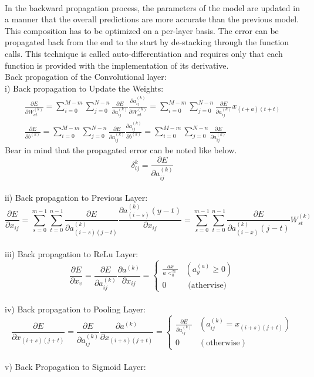 \documentclass[12pt]{revtex4}
\begin{document}
\\In the backward propagation process, the parameters of the model are updated in a manner that the overall predictions are more accurate than the previous model. This composition has to be optimized on a per-layer basis. The error can be propagated back from the end to the start by de-stacking through the function calls. This technique is called auto-differentiation and requires only that each function is provided with the implementation of its derivative.
\\Back propagation of the Convolutional layer:
\\i) Back propagation to Update the Weights:
\begin{equation}\begin{array}{c}
\frac{\partial E}{\partial W_{a t}^{(k)}}=\sum_{i=0}^{M-m} \sum_{j=0}^{N-n} \frac{\partial E}{\partial a_{i j}^{(k)}} \frac{\partial a_{i j}^{(k)}}{\partial W_{n t}^{(k)}}=\sum_{i=0}^{M-m} \sum_{j=0}^{N-n} \frac{\partial E}{\partial a_{i j}^{(k)}} x_{(i+a)(t+t)} \\
\frac{\partial E}{\partial b^{(k)}}=\sum_{i=0}^{M-m} \sum_{j=0}^{N-n} \frac{\partial E}{\partial a_{i j}^{(k)}} \frac{\partial a_{i j}^{(k)}}{\partial b^{(k)}}=\sum_{i=0}^{M-m} \sum_{j=0}^{N-n} \frac{\partial E}{\partial a_{i j}^{(k)}}
\end{array}\end{equation}
Bear in mind that the propagated error can be noted like below.
\[
\delta_{i j}^{k}=\frac{\partial E}{\partial a_{i j}^{(k)}}
\]
\\ii) Back propagation to Previous Layer:
\begin{equation}\frac{\partial E}{\partial x_{i j}}=\sum_{s=0}^{m-1} \sum_{t=0}^{n-1} \frac{\partial E}{\partial a_{(i-s)(j-t)}^{(k)}} \frac{\partial a_{(i-s)}^{(k)}(y-t)}{\partial x_{i j}}=\sum_{s=0}^{m-1} \sum_{t=0}^{n-1} \frac{\partial E}{\partial a_{(i-x)}^{(k)}(j-t)} W_{s t}^{(k)}\end{equation}
\\iii) Back propagation to ReLu Layer:
\begin{equation}\frac{\partial E}{\partial x_{v}}=\frac{\partial E}{\partial a_{i j}^{(k)}} \frac{\partial a^{(k)}}{\partial x_{i j}}=\left\{\begin{array}{ll}
\frac{a x}{a<_{0}^{\infty}} & \left(a_{y}^{(a)} \geq 0\right) \\
0 & \text { (athervise) }
\end{array}\right.\end{equation}
\\iv) Back propagation to Pooling Layer: 
\begin{equation}\frac{\partial E}{\partial x_{(i+s)(j+t)}}=\frac{\partial E}{\partial a_{i j}^{(k)}} \frac{\partial a^{(k)}}{\partial x_{(i+s)(j+t)}}=\left\{\begin{array}{ll}
\frac{\partial E}{\partial a_{i j}^{(k)}} & \left(a_{i j}^{(k)}=x_{(i+s)(j+t)}\right) \\
0 & (\text {otherwise})
\end{array}\right.\end{equation}
\\v) Back Propagation to Sigmoid Layer: 
\end{document}
